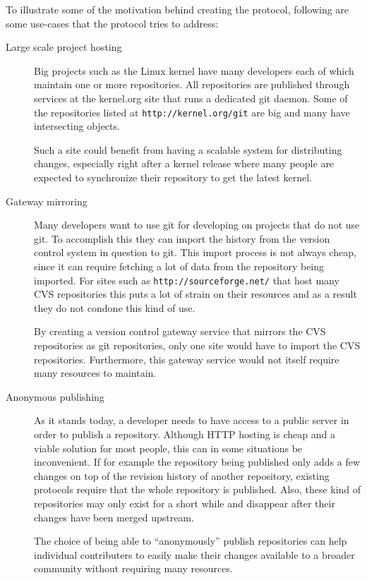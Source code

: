 To illustrate some of the motivation behind creating the protocol,
following are some use-cases that the protocol tries to address:

\begin{description}

\item[Large scale project hosting]
%
	Big projects such as the Linux kernel have many developers each
	of which maintain one or more repositories. All repositories are
	published through services at the
	kernel.org site that runs a dedicated git daemon. Some of the
	repositories listed at \texttt{http://kernel.org/git} are
	big and many have intersecting objects.

	Such a site could benefit from having a scalable system for
	distributing changes, especially right after a kernel release
	where many people are expected to synchronize their
	repository to get the latest kernel.

\item[Gateway mirroring]
%
	Many developers want to use git for developing on projects
	that do not use git. To accomplish this they can import the
	history from the version control system in question to git.
	This import process is not always cheap, since it can require
	fetching a lot of data from the repository being imported. For
	sites such as \texttt{http://sourceforge.net/} that host many CVS repositories this puts
	a lot of strain on their resources and as a result they do not
	condone this kind of use.

	By creating a version control gateway service that mirrors the
	CVS repositories as git repositories, only one site would
	have to import the CVS repositories. Furthermore, this gateway
	service would not itself require many resources to maintain.

\item[Anonymous publishing]
%
	As it stands today, a developer needs to have access to a
	public server in order to publish a repository. Although HTTP
	hosting is cheap and a viable solution for most people, this
	can in some situations be inconvenient. If for example the
	repository being published only adds a few changes on top of
	the revision history of another repository, existing protocols
	require that the whole repository is published. Also, these
	kind of repositories may only exist for a short while and
	disappear after their changes have been merged upstream.

	The choice of being able to ``anonymously'' publish
	repositories can help individual contributers to easily make
	their changes available to a broader community without
	requiring many resources.

\end{description}

